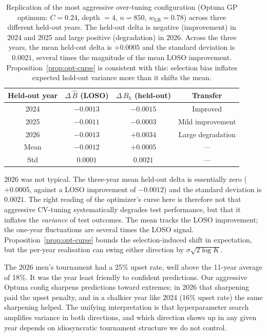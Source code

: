 \documentclass[11pt,a4paper]{article}
\theoremstyle{definition}
\begin{document}
\begin{table}[h]
\centering
\caption{Replication of the most aggressive over-tuning configuration (Optuna GP optimum: $C = 0.24$, depth $= 4$, $n = 850$, $w_{\text{LR}} = 0.78$) across three different held-out years. The held-out delta is negative (improvement) in 2024 and 2025 and large positive (degradation) in 2026. Across the three years, the mean held-out delta is $+0.0005$ and the standard deviation is $0.0021$, several times the magnitude of the mean LOSO improvement. Proposition~\ref{prop:opt-curse} is consistent with this: selection bias inflates expected hold-out variance more than it shifts the mean.}
\label{tab:cross-year}
\small
\begin{tabular}{@{}cccc@{}}
\toprule
Held-out year & $\Delta\,\hat{B}$ (LOSO) & $\Delta\,B_h$ (held-out) & Transfer \\
\midrule
2024 & $-0.0013$ & $-0.0015$ & Improved \\
2025 & $-0.0011$ & $-0.0003$ & Mild improvement \\
2026 & $-0.0013$ & $+0.0034$ & Large degradation \\
\midrule
Mean & $-0.0012$ & $+0.0005$ & --- \\
Std  & $0.0001$ & $0.0021$  & --- \\
\bottomrule
\end{tabular}
\end{table}

2026 was not typical. The three-year mean held-out delta is essentially zero ($+0.0005$, against a LOSO improvement of $-0.0012$) and the standard deviation is $0.0021$. The right reading of the optimizer's curse here is therefore not that aggressive CV-tuning systematically degrades test performance, but that it inflates the \emph{variance} of test outcomes. The mean tracks the LOSO improvement; the one-year fluctuations are several times the LOSO signal. Proposition~\ref{prop:opt-curse} bounds the selection-induced shift in expectation, but the per-year realisation can swing either direction by $\sigma \sqrt{2 \log K}$.

The 2026 men's tournament had a 25\% upset rate, well above the 11-year average of 18\%. It was the year least friendly to confident predictions. Our aggressive Optuna config sharpens predictions toward extremes; in 2026 that sharpening paid the upset penalty, and in a chalkier year like 2024 (16\% upset rate) the same sharpening helped. The unifying interpretation is that hyperparameter search amplifies variance in both directions, and which direction shows up in any given year depends on idiosyncratic tournament structure we do not control.
\end{document}

